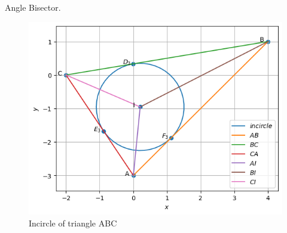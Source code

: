 \begin{table}[H]
        \centering
        
        \caption{Angle Bisector.}
        \label{tab:angle-bisector}
    \end{table}
\begin{figure}[H]
	\includegraphics[width=\columnwidth]{ang_bisec/figs/Incentre.png}
\caption{Incircle of triangle ABC}
\label{fig:i_Incentre_py}
\end{figure}

